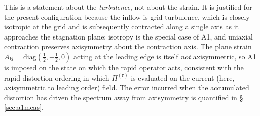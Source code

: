 \documentclass[lineno]{JFM-FLM_Au}
\begin{document}
This is a statement about the \emph{turbulence}, not about the strain. It is
justified for the present configuration because the inflow is grid turbulence,
which is closely isotropic at the grid and is subsequently contracted along a
single axis as it approaches the stagnation plane; isotropy is the special
case of A1, and uniaxial contraction preserves axisymmetry about the
contraction axis. The plane strain $A_{kl}=\mathrm{diag}(\tfrac12,-\tfrac12,0)$
acting at the leading edge is itself \emph{not} axisymmetric, so A1 is imposed
on the state on which the rapid operator acts, consistent with the
rapid-distortion ordering in which $\Pi^{(\mathrm r)}$ is evaluated on the
current (here, axisymmetric to leading order) field. The error incurred when
the accumulated distortion has driven the spectrum away from axisymmetry is
quantified in \S\,\ref{sec:a1meas}.
\end{document}
